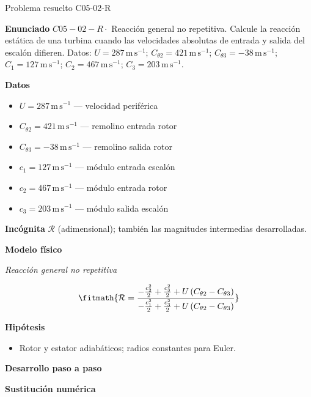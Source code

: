 \documentclass[10pt,openany]{book}
\begin{document}
\begin{studiumworked}{Problema resuelto C05-02-R}


\noindent\textbf{Enunciado}
\(C05-02-R \cdot\) Reacción general no repetitiva. Calcule la reacción estática de una turbina cuando las velocidades absolutas de entrada y salida del escalón difieren. Datos: \(U=287\, \mathrm{m}\,\mathrm{s}^{-1}\); \(C_{\theta2}=421\, \mathrm{m}\,\mathrm{s}^{-1}\); \(C_{\theta3}=-38\, \mathrm{m}\,\mathrm{s}^{-1}\); \(C_1=127\, \mathrm{m}\,\mathrm{s}^{-1}\); \(C_2=467\, \mathrm{m}\,\mathrm{s}^{-1}\); \(C_3=203\, \mathrm{m}\,\mathrm{s}^{-1}\).

\noindent\textbf{Datos}
\begin{itemize}
\item $U = 287\,\mathrm{m}\,\mathrm{s}^{-1}$ — velocidad periférica
\item $C_{\theta 2} = 421\,\mathrm{m}\,\mathrm{s}^{-1}$ — remolino entrada rotor
\item $C_{\theta 3} = -38\,\mathrm{m}\,\mathrm{s}^{-1}$ — remolino salida rotor
\item $c_{1} = 127\,\mathrm{m}\,\mathrm{s}^{-1}$ — módulo entrada escalón
\item $c_{2} = 467\,\mathrm{m}\,\mathrm{s}^{-1}$ — módulo entrada rotor
\item $c_{3} = 203\,\mathrm{m}\,\mathrm{s}^{-1}$ — módulo salida escalón
\end{itemize}

\noindent\textbf{Incógnita}
$\mathcal{R}$ (adimensional); también las magnitudes intermedias desarrolladas.

\noindent\textbf{Modelo físico}

\noindent\textit{Reacción general no repetitiva}

\[
\fitmath{\mathcal R=\frac{- \frac{c_{2}^{2}}{2} + \frac{c_{3}^{2}}{2} + U \left(C_{\theta 2} - C_{\theta 3}\right)}{- \frac{c_{1}^{2}}{2} + \frac{c_{3}^{2}}{2} + U \left(C_{\theta 2} - C_{\theta 3}\right)}}
\]

\noindent\textbf{Hipótesis}
\begin{itemize}
\item Rotor y estator adiabáticos; radios constantes para Euler.
\end{itemize}

\noindent\textbf{Desarrollo paso a paso}



\noindent\textbf{Sustitución numérica}


\end{studiumworked}
\end{document}
